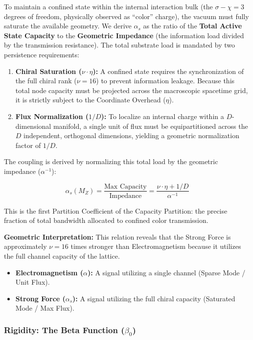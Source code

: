 To maintain a confined state within the internal interaction bulk (the $\sigma - \chi = 3$ degrees of freedom, physically observed as ``color'' charge), the vacuum must fully saturate the available geometry. We derive $\alpha_s$ as the ratio of the \textbf{Total Active State Capacity} to the \textbf{Geometric Impedance} (the information load divided by the transmission resistance). The total substrate load is mandated by two persistence requirements:
\begin{enumerate}
    \item \textbf{Chiral Saturation ($\nu \cdot \eta$):} A confined state requires the synchronization of the full chiral rank ($\nu=16$) to prevent information leakage. Because this total node capacity must be projected across the macroscopic spacetime grid, it is strictly subject to the Coordinate Overhead ($\eta$).
    \item \textbf{Flux Normalization ($1/D$):} To localize an internal charge within a $D$-dimensional manifold, a single unit of flux must be equipartitioned across the $D$ independent, orthogonal dimensions, yielding a geometric normalization factor of $1/D$.
\end{enumerate}

The coupling is derived by normalizing this total load by the geometric impedance ($\alpha^{-1}$):

\begin{equation} \label{eq:alphas_saturation}
\alpha_s(M_Z) = \frac{\text{Max Capacity}}{\text{Impedance}} 
= \frac{\nu \cdot \eta + 1/D}{\alpha^{-1}}
\end{equation}

This is the first Partition Coefficient of the Capacity Partition: the precise fraction of total bandwidth allocated to confined color transmission.

\textbf{Geometric Interpretation:} This relation reveals that the Strong Force is approximately $\nu = 16$ times stronger than Electromagnetism because it utilizes the full channel capacity of the lattice.
\begin{itemize}
    \item \textbf{Electromagnetism ($\alpha$):} A signal utilizing a single channel (Sparse Mode / Unit Flux).
    \item \textbf{Strong Force ($\alpha_s$):} A signal utilizing the full chiral capacity (Saturated Mode / Max Flux).
\end{itemize}

\subsubsection{Rigidity: The Beta Function (\texorpdfstring{$\beta_0$}{beta\_0})}


